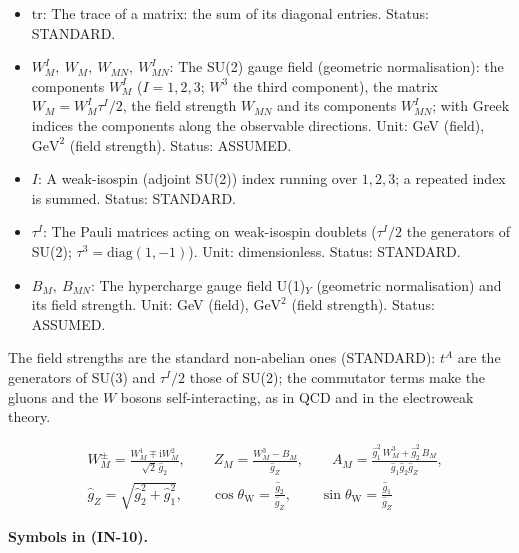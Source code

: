 \documentclass[
  10pt,
]{article}
\begin{document}
\begin{itemize}
  dimensionless. Status: STANDARD.
\item
  \(\mathrm{tr}\): The trace of a matrix: the sum of its diagonal
  entries. Status: STANDARD.
\item
  \(W^I_M,\ W_M,\ W_{MN},\ W^I_{MN}\): The SU(2) gauge field (geometric
  normalisation): the components \(W^I_M\) (\(I = 1, 2, 3\); \(W^3\) the
  third component), the matrix \(W_M = W^I_M\tau^I/2\), the field
  strength \(W_{MN}\) and its components \(W^I_{MN}\); with Greek
  indices the components along the observable directions. Unit: GeV
  (field), \(\mathrm{GeV}^{2}\) (field strength). Status: ASSUMED.
\item
  \(I\): A weak-isospin (adjoint SU(2)) index running over \(1, 2, 3\);
  a repeated index is summed. Status: STANDARD.
\item
  \(\tau^I\): The Pauli matrices acting on weak-isospin doublets
  (\(\tau^I/2\) the generators of SU(2);
  \(\tau^3 = \mathrm{diag}(1, -1)\)). Unit: dimensionless. Status:
  STANDARD.
\item
  \(B_M,\ B_{MN}\): The hypercharge gauge field U(1)\(_Y\) (geometric
  normalisation) and its field strength. Unit: GeV (field),
  \(\mathrm{GeV}^{2}\) (field strength). Status: ASSUMED.
\end{itemize}

The field strengths are the standard non-abelian ones (STANDARD):
\(t^A\) are the generators of SU(3) and \(\tau^I/2\) those of SU(2); the
commutator terms make the gluons and the \(W\) bosons self-interacting,
as in QCD and in the electroweak theory.

\[
\begin{aligned}
&W^\pm_M = \frac{W^1_M \mp \mathrm{i}W^2_M}{\sqrt2\,\hat g_2},\qquad
 Z_M = \frac{W^3_M - B_M}{\hat g_Z},\qquad A_M = \frac{\hat g_1^2\,W^3_M + \hat g_2^2\,B_M}{\hat g_1\hat
 g_2\hat g_Z},\\
&\hat g_Z = \sqrt{\hat g_2^2 + \hat g_1^2},\qquad \cos\theta_{\mathrm{W}} = \frac{\hat g_2}{\hat g_Z},\qquad
 \sin\theta_{\mathrm{W}} = \frac{\hat g_1}{\hat g_Z}
\end{aligned} \tag{IN-10}
\]

\textbf{Symbols in (IN-10).}
\end{document}
